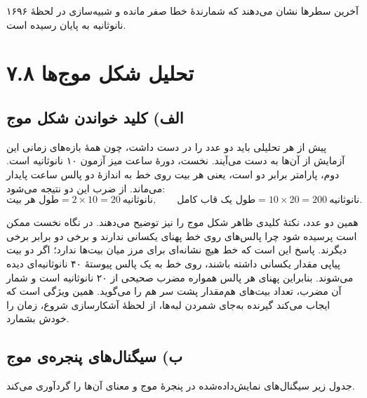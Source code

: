 \documentclass[12pt,a4paper]{article}
\begin{document}
	آخرین سطرها نشان می‌دهند که شمارندهٔ خطا صفر مانده و شبیه‌سازی در لحظهٔ ۱۶۹۶ نانوثانیه به پایان رسیده است.

	\section*{۷.۸ تحلیل شکل موج‌ها}
	\subsection*{الف) کلید خواندن شکل موج}
	پیش از هر تحلیلی باید دو عدد را در دست داشت، چون همهٔ بازه‌های زمانی این آزمایش از آن‌ها به دست می‌آیند. نخست، دورهٔ ساعت میز آزمون ۱۰ نانوثانیه است. دوم، پارامتر  برابر دو است، یعنی هر بیت روی خط به اندازهٔ دو پالس ساعت پایدار می‌ماند. از ضرب این دو نتیجه می‌شود:
	\[
	\text{طول هر بیت} = 2 \times 10 = 20\ \text{نانوثانیه},
	\qquad
	\text{طول یک قاب کامل} = 10 \times 20 = 200\ \text{نانوثانیه}.
	\]

	همین دو عدد، نکتهٔ کلیدی ظاهر شکل موج را نیز توضیح می‌دهند. در نگاه نخست ممکن است پرسیده شود چرا پالس‌های روی خط  پهنای یکسانی ندارند و برخی دو برابر برخی دیگرند. پاسخ این است که خط  هیچ نشانه‌ای برای مرز میان بیت‌ها ندارد؛ اگر دو بیت پیاپی مقدار یکسانی داشته باشند، روی خط به یک پالس پیوستهٔ ۴۰ نانوثانیه‌ای دیده می‌شوند. بنابراین پهنای هر پالس همواره مضرب صحیحی از ۲۰ نانوثانیه است و شمار آن مضرب، تعداد بیت‌های هم‌مقدار پشت سر هم را می‌گوید. همین ویژگی است که ایجاب می‌کند گیرنده به‌جای شمردن لبه‌ها، از لحظهٔ آشکارسازی شروع، زمان را خودش بشمارد.

	\subsection*{ب) سیگنال‌های پنجره‌ی موج}
	جدول زیر سیگنال‌های نمایش‌داده‌شده در پنجرهٔ موج و معنای آن‌ها را گردآوری می‌کند.
\end{document}
